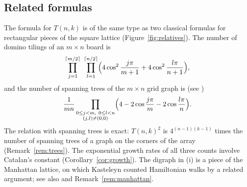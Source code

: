 \documentclass[11pt,a4paper]{amsart}
\theoremstyle{remark}
\begin{document}
\subsection{Related formulas}
The formula for $T(n,k)$ is of the same type as two classical formulas for rectangular pieces of the square
lattice (Figure~\ref{fig:relatives}). The number of domino tilings of an $m\times n$ board is
\cite{Kasteleyn61,TF}
\[ \prod_{j=1}^{\lceil m/2\rceil}\ \prod_{l=1}^{\lceil n/2\rceil}\Bigl(4\cos^2\frac{j\pi}{m+1}+4\cos^2\frac{l\pi}{n+1}\Bigr), \]
and the number of spanning trees of the $m\times n$ grid graph is (see \cite{KPW})
\[ \frac{1}{mn}\prod_{\substack{0\le j<m,\ 0\le l<n\\ (j,l)\ne(0,0)}}\Bigl(4-2\cos\frac{j\pi}{m}-2\cos\frac{l\pi}{n}\Bigr). \]
The relation with spanning trees is exact: $T(n,k)^2$ is $4^{(n-1)(k-1)}$ times the number of spanning trees of a
graph on the corners of the array (Remark~\ref{rem:trees}). The exponential growth rates of all three counts
involve Catalan's constant (Corollary~\ref{cor:growth}). The digraph in (i) is a piece of the Manhattan lattice,
on which Kasteleyn \cite{Kasteleyn} counted Hamiltonian walks by a related argument; see also \cite{DD} and
Remark~\ref{rem:manhattan}.
\end{document}
